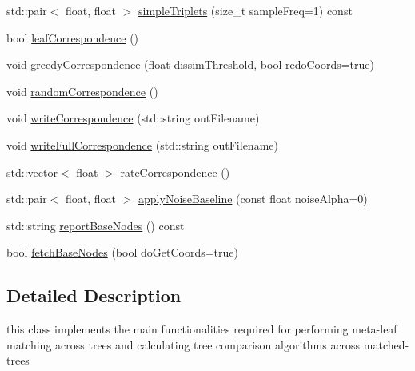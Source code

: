 \begin{DoxyCompactItemize}
\item 
std\-::pair$<$ float, float $>$ \hyperlink{classtreeComparer_aa35e905726e481a1d51103dd5f9815c7}{simple\-Triplets} (size\-\_\-t sample\-Freq=1) const 
\item 
bool \hyperlink{classtreeComparer_ac29c95118034b2cb9a1a7c2a7b438698}{leaf\-Correspondence} ()
\item 
void \hyperlink{classtreeComparer_ae160e4175a3f7d1a9563babe30c4c548}{greedy\-Correspondence} (float dissim\-Threshold, bool redo\-Coords=true)
\item 
void \hyperlink{classtreeComparer_a18327588d6bcf43220beedf4a5fa1e14}{random\-Correspondence} ()
\item 
void \hyperlink{classtreeComparer_a16b088c494e3c07fb161078959df4f97}{write\-Correspondence} (std\-::string out\-Filename)
\item 
void \hyperlink{classtreeComparer_a10108cc3f38b19be5c3383dd0a29a70f}{write\-Full\-Correspondence} (std\-::string out\-Filename)
\item 
std\-::vector$<$ float $>$ \hyperlink{classtreeComparer_ad627f4fd68587f567c9647ccca37914c}{rate\-Correspondence} ()
\item 
std\-::pair$<$ float, float $>$ \hyperlink{classtreeComparer_a2bacc683c09597ff98d0ce5352053122}{apply\-Noise\-Baseline} (const float noise\-Alpha=0)
\item 
std\-::string \hyperlink{classtreeComparer_aed2990051e67d007d168e1b1c51168f3}{report\-Base\-Nodes} () const 
\item 
bool \hyperlink{classtreeComparer_a5e381783846840c65126a49847e1e560}{fetch\-Base\-Nodes} (bool do\-Get\-Coords=true)
\end{DoxyCompactItemize}


\subsection{\-Detailed \-Description}
this class implements the main functionalities required for performing meta-\/leaf matching across trees and calculating tree comparison algorithms across matched-\/trees 

